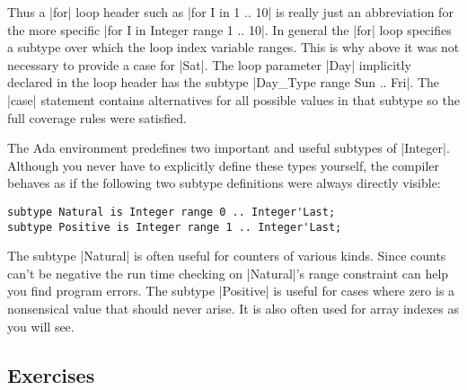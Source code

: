 \noindent Thus a |for| loop header such as |for I in 1 .. 10| is really just an abbreviation for
the more specific |for I in Integer range 1 .. 10|. In general the |for| loop specifies a
subtype over which the loop index variable ranges. This is why above it was not necessary to
provide a case for |Sat|. The loop parameter |Day| implicitly declared in the loop header has
the subtype |Day_Type range Sun .. Fri|. The |case| statement contains alternatives for all
possible values in that subtype so the full coverage rules were satisfied.

The Ada environment predefines two important and useful subtypes of |Integer|. Although you
never have to explicitly define these types yourself, the compiler behaves as if the following
two subtype definitions were always directly visible:

\begin{lstlisting}
subtype Natural is Integer range 0 .. Integer'Last;
subtype Positive is Integer range 1 .. Integer'Last;
\end{lstlisting}

\noindent The subtype |Natural| is often useful for counters of various kinds. Since counts
can't be negative the run time checking on |Natural|'s range constraint can help you find
program errors. The subtype |Positive| is useful for cases where zero is a nonsensical value
that should never arise. It is also often used for array indexes as you will see.

\subsection*{Exercises}


